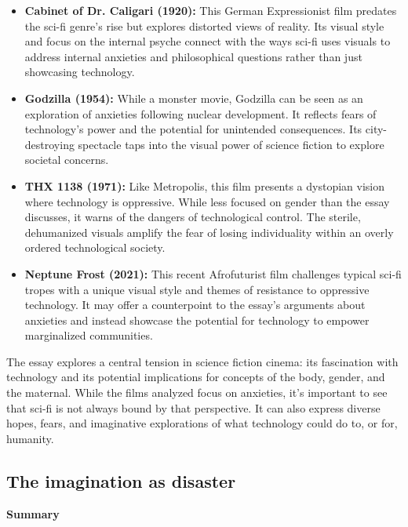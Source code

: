 \documentclass[11pt,fleqn]{book} %
\begin{document}
\begin{itemize} 
\item \textbf{Cabinet of Dr. Caligari (1920):}  This German Expressionist film predates the sci-fi genre's rise but explores distorted views of reality.  Its visual style and focus on the internal psyche connect with the ways sci-fi uses visuals to address internal anxieties and philosophical questions rather than just showcasing technology.  

\item \textbf{Godzilla (1954):} While a monster movie, Godzilla can be seen as an exploration of anxieties following nuclear development. It reflects fears of technology's power and the potential for unintended consequences. Its city-destroying spectacle taps into the visual power of science fiction to explore societal concerns. 

\item \textbf{THX 1138 (1971):}  Like Metropolis, this film presents a dystopian vision where technology is oppressive. While less focused on gender than the essay discusses, it warns of the dangers of technological control. The sterile, dehumanized visuals amplify the fear of losing individuality within an overly ordered technological society.  

\item \textbf{Neptune Frost (2021):} This recent Afrofuturist film challenges typical sci-fi tropes with a unique visual style and themes of resistance to oppressive technology. It may offer a counterpoint to the essay's arguments about anxieties and instead showcase the potential for technology to empower marginalized communities.
\end{itemize}

\vspace{5pt} 

The essay explores a central tension in science fiction cinema: its fascination with technology and its potential implications for concepts of the body, gender, and the maternal.  While the films analyzed focus on anxieties, it's important to see that sci-fi is not always bound by that perspective. It can also express diverse hopes, fears, and imaginative explorations of what technology could do to, or for, humanity. 

\subsection{The imagination as disaster}
\textbf{Summary}
\end{document}
